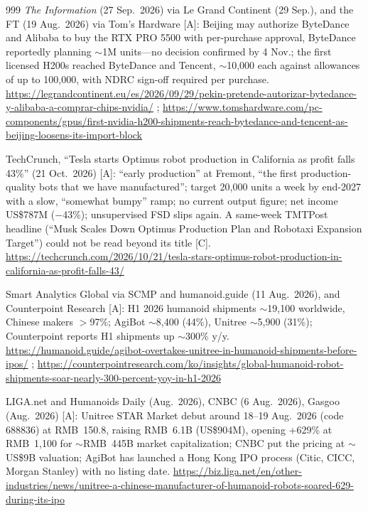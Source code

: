 \begin{thebibliography}{999}
 \emph{The Information} (27 Sep.\ 2026) via Le Grand Continent (29 Sep.), and the FT (19 Aug.\ 2026) via Tom's Hardware [A]: Beijing may authorize ByteDance and Alibaba to buy the RTX PRO 5500 with per-purchase approval, ByteDance reportedly planning $\sim$1M units---no decision confirmed by 4 Nov.; the first licensed H200s reached ByteDance and Tencent, $\sim$10,000 each against allowances of up to 100,000, with NDRC sign-off required per purchase. \url{https://legrandcontinent.eu/es/2026/09/29/pekin-pretende-autorizar-bytedance-y-alibaba-a-comprar-chips-nvidia/} ; \url{https://www.tomshardware.com/pc-components/gpus/first-nvidia-h200-shipments-reach-bytedance-and-tencent-as-beijing-loosens-its-import-block}

 TechCrunch, ``Tesla starts Optimus robot production in California as profit falls 43\%'' (21 Oct.\ 2026) [A]: ``early production'' at Fremont, ``the first production-quality bots that we have manufactured''; target 20,000 units a week by end-2027 with a slow, ``somewhat bumpy'' ramp; no current output figure; net income US\$787M ($-$43\%); unsupervised FSD slips again. A same-week TMTPost headline (``Musk Scales Down Optimus Production Plan and Robotaxi Expansion Target'') could not be read beyond its title [C]. \url{https://techcrunch.com/2026/10/21/tesla-stars-optimus-robot-production-in-california-as-profit-falls-43/}

 Smart Analytics Global via SCMP and humanoid.guide (11 Aug.\ 2026), and Counterpoint Research [A]: H1 2026 humanoid shipments $\sim$19,100 worldwide, Chinese makers $>$97\%; AgiBot $\sim$8,400 (44\%), Unitree $\sim$5,900 (31\%); Counterpoint reports H1 shipments up $\sim$300\% y/y. \url{https://humanoid.guide/agibot-overtakes-unitree-in-humanoid-shipments-before-ipos/} ; \url{https://counterpointresearch.com/ko/insights/global-humanoid-robot-shipments-soar-nearly-300-percent-yoy-in-h1-2026}

 LIGA.net and Humanoids Daily (Aug.\ 2026), CNBC (6 Aug.\ 2026), Gasgoo (Aug.\ 2026) [A]: Unitree STAR Market debut around 18--19 Aug.\ 2026 (code 688836) at RMB~150.8, raising RMB~6.1B (US\$904M), opening +629\% at RMB~1,100 for $\sim$RMB~445B market capitalization; CNBC put the pricing at $\sim$US\$9B valuation; AgiBot has launched a Hong Kong IPO process (Citic, CICC, Morgan Stanley) with no listing date. \url{https://biz.liga.net/en/other-industries/news/unitree-a-chinese-manufacturer-of-humanoid-robots-soared-629-during-its-ipo}


\end{thebibliography}
